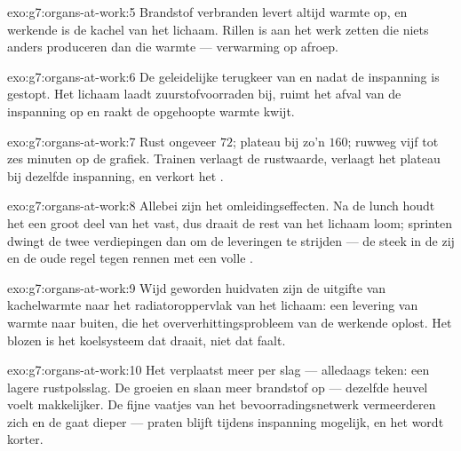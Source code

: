 \begin{solution}{exo:g7:organs-at-work:5}
Brandstof verbranden levert altijd warmte op, en werkende  is de
kachel van het lichaam. Rillen is  aan het werk zetten die niets
anders produceren dan die warmte --- verwarming op afroep.
\end{solution}

\begin{solution}{exo:g7:organs-at-work:6}
De geleidelijke terugkeer van  en  nadat de inspanning
is gestopt. Het lichaam laadt zuurstofvoorraden bij, ruimt het afval van
de inspanning op en raakt de opgehoopte warmte kwijt.
\end{solution}

\begin{solution}{exo:g7:organs-at-work:7}
Rust ongeveer $72$; plateau bij zo'n $160$;  ruwweg vijf tot zes
minuten op de grafiek. Trainen verlaagt de rustwaarde, verlaagt het
plateau bij dezelfde inspanning, en verkort het .
\end{solution}

\begin{solution}{exo:g7:organs-at-work:8}
Allebei zijn het omleidingseffecten. Na de lunch houdt het
 een groot deel van het  vast, dus draait de
rest van het lichaam loom; sprinten dwingt de twee verdiepingen dan om de
leveringen te strijden --- de steek in de zij en de oude regel tegen
rennen met een volle .
\end{solution}

\begin{solution}{exo:g7:organs-at-work:9}
Wijd geworden huidvaten zijn de uitgifte van kachelwarmte naar het
radiatoroppervlak van het lichaam: een levering van warmte naar buiten,
die het oververhittingsprobleem van de werkende  oplost. Het blozen
is het koelsysteem dat draait, niet dat faalt.
\end{solution}

\begin{solution}{exo:g7:organs-at-work:10}
Het  verplaatst meer  per slag --- alledaags teken: een lagere
rustpolsslag. De  groeien en slaan meer brandstof op --- dezelfde
heuvel voelt makkelijker. De fijne vaatjes van het bevoorradingsnetwerk
vermeerderen zich en de  gaat dieper --- praten blijft tijdens
inspanning mogelijk, en het  wordt korter.
\end{solution}

